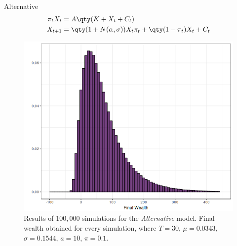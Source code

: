\documentclass[10pt]{beamer}
\begin{document}
\begin{frame}[fragile]{Alternative}
  \begin{align*}
    \pi_t X_t &= A\qty(K + X_t + C_t) \\
    X_{t+1} &= \qty(1 + N(\alpha, \sigma))X_t \pi_t + \qty(1 - \pi_t)X_t + C_t
  \end{align*}

  \begin{figure}[h]
    \centering
    \includegraphics[scale=0.3]{fw_alt.png}
    \caption{Results of $100,000$ simulations for the \textit{Alternative} model. Final wealth obtained for every simulation, where $T=30$, $\mu = 0.0343$, $\sigma = 0.1544$, $a=10$, $\pi = 0.1$.}
    \label{fig:fw_alt}
  \end{figure}
\end{frame}
\end{document}
